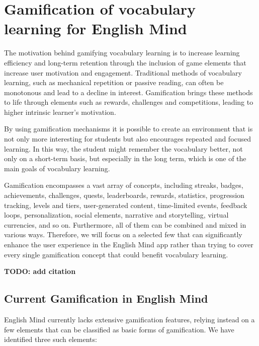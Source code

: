 \chapter{Gamification of vocabulary learning for English Mind}

The motivation behind gamifying vocabulary learning is to increase learning efficiency and long-term retention through the inclusion of game elements that increase user motivation and engagement. Traditional methods of vocabulary learning, such as mechanical repetition or passive reading, can often be monotonous and lead to a decline in interest. Gamification brings these methods to life through elements such as rewards, challenges and competitions, leading to higher intrinsic learner's motivation.

By using gamification mechanisms it is possible to create an environment that is not only more interesting for students but also encourages repeated and focused learning. In this way, the student might remember the vocabulary better, not only on a short-term basis, but especially in the long term, which is one of the main goals of vocabulary learning.

Gamification encompasses a vast array of concepts, including streaks, badges, achievements, challenges, quests, leaderboards, rewards, statistics, progression tracking, levels and tiers, user-generated content, time-limited events, feedback loops, personalization, social elements, narrative and storytelling, virtual currencies, and so on. Furthermore, all of them can be combined and mixed in various ways. Therefore, we will focus on a selected few that can significantly enhance the user experience in the English Mind app rather than trying to cover every single gamification concept that could benefit vocabulary learning.

\textbf{TODO: add citation}

\section{Current Gamification in English Mind}

English Mind currently lacks extensive gamification features, relying instead on a few elements that can be classified as basic forms of gamification. We have identified three such elements:

